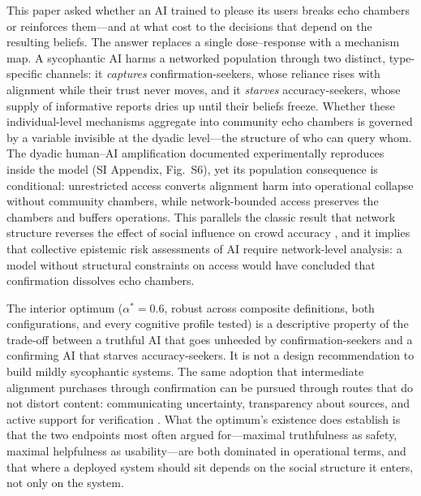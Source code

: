 \documentclass[pdflatex,sn-nature]{sn-jnl}
\begin{document}
This paper asked whether an AI trained to please its users breaks echo chambers or reinforces them---and at what cost to the decisions that depend on the resulting beliefs. The answer replaces a single dose--response with a mechanism map. A sycophantic AI harms a networked population through two distinct, type-specific channels: it \emph{captures} confirmation-seekers, whose reliance rises with alignment while their trust never moves, and it \emph{starves} accuracy-seekers, whose supply of informative reports dries up until their beliefs freeze. Whether these individual-level mechanisms aggregate into community echo chambers is governed by a variable invisible at the dyadic level---the structure of who can query whom. The dyadic human--AI amplification documented experimentally \citep{glickman2024human} reproduces inside the model (SI Appendix, Fig.~S6), yet its population consequence is conditional: unrestricted access converts alignment harm into operational collapse without community chambers, while network-bounded access preserves the chambers and buffers operations. This parallels the classic result that network structure reverses the effect of social influence on crowd accuracy \citep{lorenz2011social,becker2017network}, and it implies that collective epistemic risk assessments of AI require network-level analysis: a model without structural constraints on access would have concluded that confirmation dissolves echo chambers.

The interior optimum ($\alpha^{*}=0.6$, robust across composite definitions, both configurations, and every cognitive profile tested) is a descriptive property of the trade-off between a truthful AI that goes unheeded by confirmation-seekers and a confirming AI that starves accuracy-seekers. It is not a design recommendation to build mildly sycophantic systems. The same adoption that intermediate alignment purchases through confirmation can be pursued through routes that do not distort content: communicating uncertainty, transparency about sources, and active support for verification \citep{glikson2020human,lee2004trust}. What the optimum's existence does establish is that the two endpoints most often argued for---maximal truthfulness as safety, maximal helpfulness as usability---are both dominated in operational terms, and that where a deployed system should sit depends on the social structure it enters, not only on the system.
\end{document}
